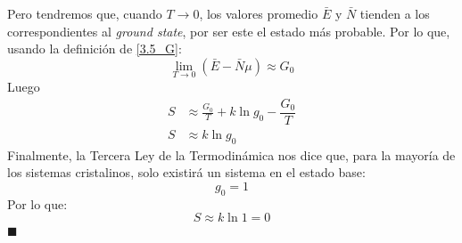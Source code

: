\documentclass[]{article}
\numberwithin{equation}{section}
\newcommand{\0}{\textcolor{gray}{0}}
\newcommand{\qed}{\hfill\(\blacksquare\)}
\begin{document}
Pero tendremos que, cuando \(T\rightarrow 0\), los valores promedio \(\bar{E}\) y \(\bar{N}\) tienden a los correspondientes al \textit{ground state}, por ser este el estado más probable. Por lo que, usando la definición de \ref{3.5_G}:
\begin{equation}
	\lim_{T\rightarrow 0} \left(\bar{E} - \bar{N}\mu\right) \approx G_0
\end{equation}
Luego
\begin{align}
	S &\approx \frac{G_0}{T} + k \ln g_0 - \dfrac{G_0}{T}\nonumber\\
	S &\approx k\ln g_0
\end{align}
Finalmente, la Tercera Ley de la Termodinámica nos dice que, para la mayoría de los sistemas cristalinos, solo existirá un sistema en el estado base:
\begin{equation}
	g_0 = 1
\end{equation}
Por lo que:
\begin{equation}
	S \approx k\ln 1 = 0
\end{equation}
\qed
\end{document}
